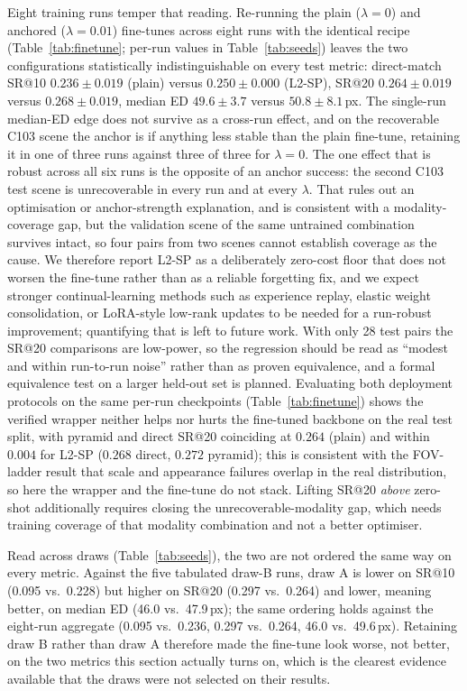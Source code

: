 \documentclass[fleqn,10pt]{wlscirep}
\begin{document}
Eight training runs temper that reading. Re-running the plain ($\lambda=0$) and anchored ($\lambda=0.01$) fine-tunes across eight runs with the identical recipe (Table~\ref{tab:finetune}; per-run values in Table~\ref{tab:seeds}) leaves the two configurations statistically indistinguishable on every test metric: direct-match SR@10 $0.236\pm0.019$ (plain) versus $0.250\pm0.000$ (L2-SP), SR@20 $0.264\pm0.019$ versus $0.268\pm0.019$, median ED $49.6\pm3.7$ versus $50.8\pm8.1$\,px. The single-run median-ED edge does not survive as a cross-run effect, and on the recoverable C103 scene the anchor is if anything less stable than the plain fine-tune, retaining it in one of three runs against three of three for $\lambda=0$. The one effect that is robust across all six runs is the opposite of an anchor success: the second C103 test scene is unrecoverable in every run and at every $\lambda$. That rules out an optimisation or anchor-strength explanation, and is consistent with a modality-coverage gap, but the validation scene of the same untrained combination survives intact, so four pairs from two scenes cannot establish coverage as the cause. We therefore report L2-SP as a deliberately zero-cost floor that does not worsen the fine-tune rather than as a reliable forgetting fix, and we expect stronger continual-learning methods such as experience replay, elastic weight consolidation\cite{kirkpatrick2017ewc}, or LoRA-style low-rank updates\cite{hu2022lora} to be needed for a run-robust improvement; quantifying that is left to future work. With only 28 test pairs the SR@20 comparisons are low-power, so the regression should be read as ``modest and within run-to-run noise'' rather than as proven equivalence, and a formal equivalence test on a larger held-out set is planned. Evaluating both deployment protocols on the same per-run checkpoints (Table~\ref{tab:finetune}) shows the verified wrapper neither helps nor hurts the fine-tuned backbone on the real test split, with pyramid and direct SR@20 coinciding at $0.264$ (plain) and within $0.004$ for L2-SP ($0.268$ direct, $0.272$ pyramid); this is consistent with the FOV-ladder result that scale and appearance failures overlap in the real distribution, so here the wrapper and the fine-tune do not stack. Lifting SR@20 \emph{above} zero-shot additionally requires closing the unrecoverable-modality gap, which needs training coverage of that modality combination and not a better optimiser.

Read across draws (Table~\ref{tab:seeds}), the two are not ordered the same way on every metric. Against the five tabulated draw-B runs, draw A is lower on SR@10 (0.095 vs.\ 0.228) but higher on SR@20 (0.297 vs.\ 0.264) and lower, meaning better, on median ED (46.0 vs.\ 47.9\,px); the same ordering holds against the eight-run aggregate (0.095 vs.\ 0.236, 0.297 vs.\ 0.264, 46.0 vs.\ 49.6\,px). Retaining draw B rather than draw A therefore made the fine-tune look worse, not better, on the two metrics this section actually turns on, which is the clearest evidence available that the draws were not selected on their results.
\end{document}
